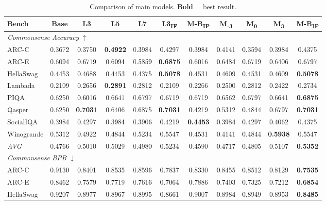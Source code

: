 
\begin{table}[htbp]
\centering
\setlength{\tabcolsep}{2.5pt}
\caption{Comparison of main models. \textbf{Bold} = best result.}
\label{tab:main_results}
\begin{tabular}{lcccccccccc}
\toprule
Bench & Base & L3 & L5 & L7 & L3\textsubscript{IF} & M-B\textsubscript{IP} & M\textsubscript{-3} & M\textsubscript{0} & M\textsubscript{3} & M-B\textsubscript{IF} \\
\midrule
\multicolumn{11}{l}{\textit{Commonsense Accuracy} $\uparrow$} \\
ARC-C & 0.3672 & 0.3750 & \textbf{0.4922} & 0.3984 & 0.4297 & 0.3984 & 0.4141 & 0.3594 & 0.3984 & 0.4375 \\
ARC-E & 0.6094 & 0.6719 & 0.6094 & 0.5859 & \textbf{0.6875} & 0.6016 & 0.6484 & 0.6719 & 0.6406 & 0.6797 \\
HellaSwag & 0.4453 & 0.4688 & 0.4453 & 0.4375 & \textbf{0.5078} & 0.4531 & 0.4609 & 0.4531 & 0.4609 & \textbf{0.5078} \\
Lambada & 0.2109 & 0.2656 & \textbf{0.2891} & 0.2812 & 0.2109 & 0.2266 & 0.2500 & 0.2812 & 0.2422 & 0.2734 \\
PIQA & 0.6250 & 0.6016 & 0.6641 & 0.6797 & 0.6719 & 0.6719 & 0.6562 & 0.6797 & 0.6641 & \textbf{0.6875} \\
Qasper & 0.6250 & \textbf{0.7031} & 0.6406 & 0.6875 & \textbf{0.7031} & 0.4219 & 0.5312 & 0.4844 & 0.6797 & \textbf{0.7031} \\
SocialIQA & 0.3984 & 0.4297 & 0.3984 & 0.3906 & 0.4219 & \textbf{0.4453} & 0.3984 & 0.4297 & 0.4062 & 0.4375 \\
Winogrande & 0.5312 & 0.4922 & 0.4844 & 0.5234 & 0.5547 & 0.4531 & 0.4141 & 0.4844 & \textbf{0.5938} & 0.5547 \\
\textit{AVG} & 0.4766 & 0.5010 & 0.5029 & 0.4980 & 0.5234 & 0.4590 & 0.4717 & 0.4805 & 0.5107 & \textbf{0.5352} \\
\midrule
\multicolumn{11}{l}{\textit{Commonsense BPB} $\downarrow$} \\
ARC-C & 0.9130 & 0.8401 & 0.8535 & 0.8596 & 0.7837 & 0.8330 & 0.8455 & 0.8512 & 0.8129 & \textbf{0.7535} \\
ARC-E & 0.8462 & 0.7579 & 0.7719 & 0.7616 & 0.7064 & 0.7886 & 0.7403 & 0.7325 & 0.7212 & \textbf{0.6854} \\
HellaSwag & 0.9207 & 0.8977 & 0.8967 & 0.8995 & 0.8661 & 0.9007 & 0.8984 & 0.8949 & 0.8953 & \textbf{0.8485} \\

\end{tabular}
\end{table}
